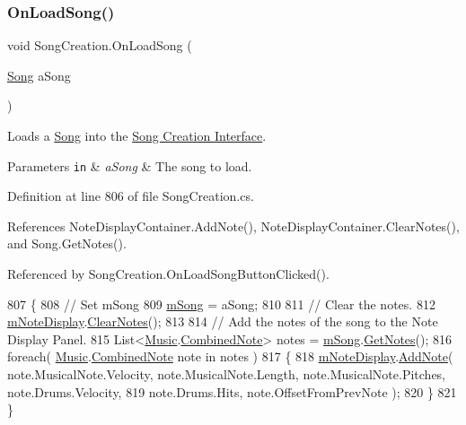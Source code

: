 \subsubsection{\texorpdfstring{On\+Load\+Song()}{OnLoadSong()}}
{\footnotesize\ttfamily void Song\+Creation.\+On\+Load\+Song (\begin{DoxyParamCaption}\item[{\hyperlink{class_song}{Song}}]{a\+Song }\end{DoxyParamCaption})\hspace{0.3cm}{\ttfamily [private]}}



Loads a \hyperlink{class_song}{Song} into the \hyperlink{group___doc_s_c}{Song Creation Interface}. 


\begin{DoxyParams}[1]{Parameters}
\mbox{\tt in}  & {\em a\+Song} & The song to load. \\
\hline
\end{DoxyParams}


Definition at line 806 of file Song\+Creation.\+cs.



References Note\+Display\+Container.\+Add\+Note(), Note\+Display\+Container.\+Clear\+Notes(), and Song.\+Get\+Notes().



Referenced by Song\+Creation.\+On\+Load\+Song\+Button\+Clicked().


\begin{DoxyCode}
807     \{
808         \textcolor{comment}{// Set mSong}
809         \hyperlink{group___s_c_priv_var_ga9554e9b3758d1cc1e841a5f7d8aa9f56}{mSong} = aSong;
810 
811         \textcolor{comment}{// Clear the notes.}
812         \hyperlink{group___s_c_priv_var_ga19cefeb7077126193c7f60d07dfdf32c}{mNoteDisplay}.\hyperlink{class_note_display_container_abcbda84772a6e66780b0f21928edf853}{ClearNotes}();
813 
814         \textcolor{comment}{// Add the notes of the song to the Note Display Panel.}
815         List<\hyperlink{class_music}{Music}.\hyperlink{group___music_structs_struct_music_1_1_combined_note}{CombinedNote}> notes = \hyperlink{group___s_c_priv_var_ga9554e9b3758d1cc1e841a5f7d8aa9f56}{mSong}.\hyperlink{group___song_const_gae68b5599292e27409d6599d00b5bbfa2}{GetNotes}();
816         \textcolor{keywordflow}{foreach}( \hyperlink{class_music}{Music}.\hyperlink{group___music_structs_struct_music_1_1_combined_note}{CombinedNote} note in notes )
817         \{
818             \hyperlink{group___s_c_priv_var_ga19cefeb7077126193c7f60d07dfdf32c}{mNoteDisplay}.\hyperlink{class_note_display_container_aa108ddf1c59c22600eb47b6ccc831573}{AddNote}( note.MusicalNote.Velocity, note.MusicalNote.Length, 
      note.MusicalNote.Pitches, note.Drums.Velocity,
819                 note.Drums.Hits, note.OffsetFromPrevNote );
820         \}
821     \}
\end{DoxyCode}
\mbox{\label{group___s_c_handlers_ga77a56bedfce632cf7c341f8fefc02b9a}} 

